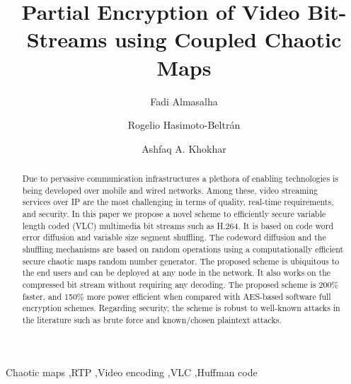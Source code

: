 \documentclass[preprint]{elsarticle}
\begin{document}
\begin{frontmatter}

\title{Partial Encryption of Video Bit-Streams using Coupled Chaotic Maps}

\author[fa]{Fadi Almasalha}


\author[rh]{Rogelio Hasimoto-Beltr\'an}


\author[ak]{Ashfaq A. Khokhar }


\address[fa]{Applied Science Private University, Amman, Jordan.}
\address[rh]{Center for Research in Mathematics (CIMAT), Guanajuato, M\'exico.}
\address[ak]{Department of ECE, Illinois Institute of Technology, Chicago, IL.}

\begin{abstract}
Due to pervasive communication infrastructures a plethora of enabling technologies is being developed over mobile and wired networks. Among these, video streaming services over IP are the most challenging in terms of quality, real-time requirements, and security. In this paper we propose a novel scheme to efficiently secure variable length coded (VLC) multimedia bit streams such as H.264. It is based on code word error diffusion and variable size segment shuffling. The codeword diffusion and the shuffling mechanisms are based on random operations using a computationally efficient secure chaotic maps random number generator. The proposed scheme is ubiquitous to the end users and can be deployed at any node in the network. It also works on the compressed bit stream without requiring any decoding. The proposed scheme is 200\% faster, and 150\% more power efficient when compared with AES-based software full encryption schemes. Regarding security, the scheme is robust to well-known attacks in the literature such as brute force and known/chosen plaintext attacks.
\end{abstract}

\begin{keyword}
Chaotic maps \sep RTP \sep Video encoding \sep VLC \sep Huffman code 
\end{keyword}

\end{frontmatter}

\linenumbers
\end{document}
